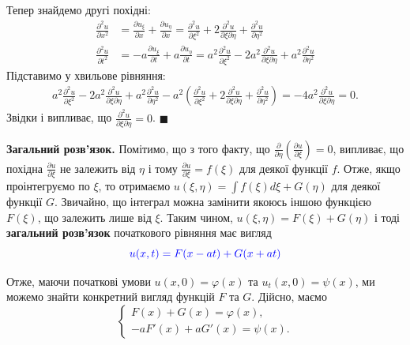 \documentclass{exam_template}
\begin{document}
Тепер знайдемо другі похідні:
\begin{align*}
    \frac{\partial^2 u}{\partial x^2} &= \frac{\partial u_{\xi}}{\partial x} + \frac{\partial u_{\eta}}{\partial x} = \frac{\partial^2 u}{\partial \xi^2} +
2\frac{\partial^2 u}{\partial \xi \partial \eta} + \frac{\partial^2 u}{\partial
\eta^2} \\
    \frac{\partial^2 u}{\partial t^2} &= -a\frac{\partial u_{\xi}}{\partial t} + a\frac{\partial u_{\eta}}{\partial t} = a^2\frac{\partial^2 u}{\partial \xi^2} -
2a^2\frac{\partial^2 u}{\partial \xi \partial \eta} + a^2\frac{\partial^2 u}{\partial
\eta^2} 
\end{align*}
Підставимо у хвильове рівняння:
\begin{gather*}
    a^2\frac{\partial^2 u}{\partial \xi^2} - 2a^2\frac{\partial^2 u}{\partial \xi \partial \eta} + a^2\frac{\partial^2 u}{\partial \eta^2} 
    - a^2\left(\frac{\partial^2 u}{\partial \xi^2} +
2\frac{\partial^2 u}{\partial \xi \partial \eta} + \frac{\partial^2 u}{\partial
\eta^2}\right) = -4a^2\frac{\partial^2 u}{\partial \xi\partial \eta} = 0.
\end{gather*}
Звідки і випливає, що $\frac{\partial^2 u}{\partial \xi\partial \eta} = 0$.
\hfill $\blacksquare$

\textbf{Загальний розв'язок.} Помітимо, що з того факту, що $\frac{\partial}{\partial
\eta}\left(\frac{\partial u}{\partial \xi}\right) = 0$, випливає, що похідна
$\frac{\partial u}{\partial \xi}$ не залежить від $\eta$ і тому $\frac{\partial
u}{\partial \xi} = f(\xi)$ для деякої функції $f$. Отже, якщо проінтегруємо по
$\xi$, то отримаємо $u(\xi,\eta) = \int f(\xi)d\xi + G(\eta)$ для деякої функції
$G$. Звичайно, що інтеграл можна замінити якоюсь іншою функцією $F(\xi)$, що
залежить лише від $\xi$. Таким чином, $u(\xi,\eta) = F(\xi)+G(\eta)$ і тоді
\textbf{загальний розв'язок} початкового рівняння має вигляд
\begin{equation*}
    \textcolor{blue}{u(x,t) = F(x-at) + G(x+at)}
\end{equation*}

Отже, маючи початкові умови $u(x,0)=\varphi(x)$ та $u_t(x,0)=\psi(x)$, ми можемо
знайти конкретний вигляд функцій $F$ та $G$. Дійсно, маємо
\begin{equation*}
    \begin{cases}
        F(x) + G(x) = \varphi(x), \\
        -aF'(x) + aG'(x) = \psi(x).
    \end{cases}
\end{equation*}
\end{document}
